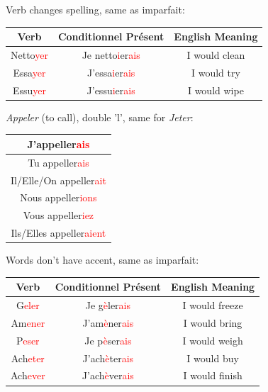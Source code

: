 \documentclass{book}
\begin{document}
Verb changes spelling, same as imparfait:
\begin{center}
    \begin{tabular}{|c|c|c|}
        \hline
        \textbf{Verb} & \textbf{Conditionnel Présent} & \textbf{English Meaning} \\
        \hline
        Netto\textcolor{red}{yer} & Je netto\textcolor{red}{i}er\textcolor{red}{ais} & I would clean \\
        \hline
        Essa\textcolor{red}{yer} & J'essa\textcolor{red}{i}er\textcolor{red}{ais} & I would try \\
        \hline
        Essu\textcolor{red}{yer} & J'essu\textcolor{red}{i}er\textcolor{red}{ais} & I would wipe \\
        \hline
    \end{tabular}
\end{center}
\textit{Appeler} (to call), double 'l', same for \textit{Jeter}:
\begin{center}
    \begin{tabular}{|c|}
        \hline
        J'appeller\textcolor{red}{ais} \\
        \hline
        Tu appeller\textcolor{red}{ais} \\
        \hline
        Il/Elle/On appeller\textcolor{red}{ait} \\
        \hline
        Nous appeller\textcolor{red}{ions} \\
        \hline
        Vous appeller\textcolor{red}{iez} \\
        \hline
        Ils/Elles appeller\textcolor{red}{aient} \\
        \hline
    \end{tabular}
\end{center}
Words don't have accent, same as imparfait:
\begin{center}
    \begin{tabular}{|c|c|c|}
        \hline
        \textbf{Verb} & \textbf{Conditionnel Présent} & \textbf{English Meaning} \\
        \hline
        G\textcolor{red}{eler} & Je g\textcolor{red}{è}ler\textcolor{red}{ais} & I would freeze \\
        \hline
        Am\textcolor{red}{ener} & J'am\textcolor{red}{è}ner\textcolor{red}{ais} & I would bring \\
        \hline
        P\textcolor{red}{eser} & Je p\textcolor{red}{è}ser\textcolor{red}{ais} & I would weigh \\
        \hline
        Ach\textcolor{red}{eter} & J'ach\textcolor{red}{è}ter\textcolor{red}{ais} & I would buy \\
        \hline
        Ach\textcolor{red}{ever} & J'ach\textcolor{red}{è}ver\textcolor{red}{ais} & I would finish \\
        \hline
    \end{tabular}
\end{center}
\end{document}
